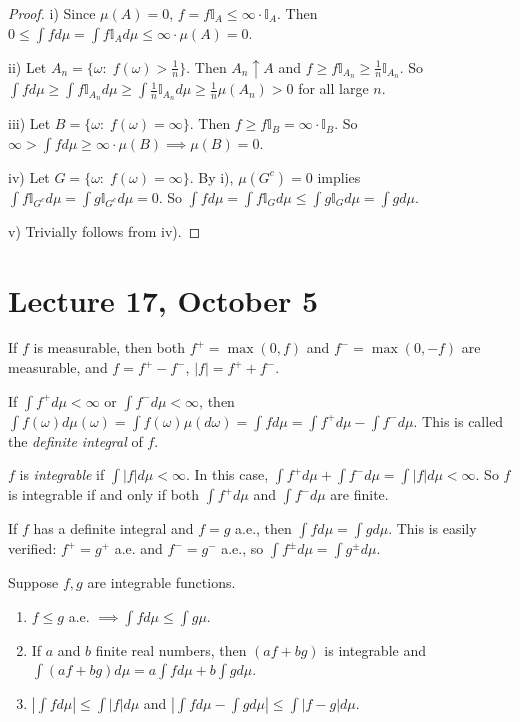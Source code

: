 \documentclass[11pt,fleqn]{book} %
\begin{document}
\begin{proof}
	i) Since $\mu(A) = 0$, $f = f\mathbb{I}_A \leq \infty \cdot \mathbb{I}_A$. Then $0 \leq \int f d\mu = \int f\mathbb{I}_A d\mu \leq \infty \cdot \mu(A) = 0$.

	ii) Let $A_n = \{\omega:\;f(\omega) > \frac{1}{n}\}$. Then $A_n \uparrow A$ and $f \geq f\mathbb{I}_{A_n} \geq \frac{1}{n}\mathbb{I}_{A_n}$. So $\int f d\mu \geq \int f\mathbb{I}_{A_n} d\mu \geq \int \frac{1}{n}\mathbb{I}_{A_n} d\mu \geq \frac{1}{n} \mu(A_n) > 0$ for all large $n$.

	iii) Let $B = \{\omega:\;f(\omega) = \infty\}$. Then $f \geq f\mathbb{I}_B = \infty \cdot \mathbb{I}_B$. So $\infty > \int f d\mu \geq \infty \cdot \mu(B) \implies \mu(B) = 0$.

	iv) Let $G = \{\omega:\;f(\omega) = \infty\}$. By i), $\mu(G^c) = 0$ implies $\int f\mathbb{I}_{G^c} d\mu = \int g\mathbb{I}_{G^c} d\mu = 0$. So $\int f d\mu = \int f\mathbb{I}_G d\mu \leq \int g\mathbb{I}_G d\mu = \int g d\mu$.

	v) Trivially follows from iv).
\end{proof}

\section{Lecture 17, October 5}

If $f$ is measurable, then both $f^+ = \max(0,f)$ and $f^- = \max(0,-f)$ are measurable, and $f = f^+-f^-$, $|f| = f^++f^-$.

If $\int f^+ d\mu < \infty$ or $\int f^- d\mu < \infty$, then $\int f(\omega) d\mu(\omega) = \int f(\omega) \mu(d\omega) = \int f d\mu = \int f^+ d\mu - \int f^- d\mu$. This is called the \emph{definite integral} of $f$.

\begin{definition} \label{def:integrable}
	$f$ is \emph{integrable} if $\int |f| d\mu < \infty$. In this case, $\int f^+ d\mu + \int f^- d\mu = \int |f| d\mu < \infty$. So $f$ is integrable if and only if both $\int f^+ d\mu$ and $\int f^- d\mu$ are finite.
\end{definition}

If $f$ has a definite integral and $f = g$ a.e., then $\int f d\mu = \int g d\mu$. This is easily verified: $f^+ = g^+$ a.e. and $f^- = g^-$ a.e., so $\int f^{\pm} d\mu = \int g^{\pm} d\mu$.

\begin{theorem} \label{thm:integrable-properties}
	Suppose $f,g$ are integrable functions.
	\begin{enumerate}[label=\roman*)]
		\item $f \leq g$ a.e. $\implies \int f d\mu \leq \int g \mu$.
		\item If $a$ and $b$ finite real numbers, then $(af + bg)$ is integrable and $\int (af + bg) d\mu = a \int f d\mu + b \int g d\mu$.
		\item $|\int f d\mu| \leq \int |f| d\mu$ and $|\int f d\mu - \int g d\mu| \leq \int |f-g| d\mu$.
	\end{enumerate}
\end{theorem}
\end{document}
